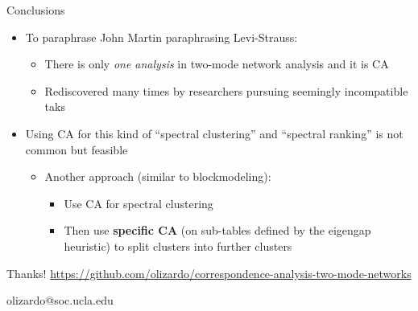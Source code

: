 \documentclass[
  ignorenonframetext,
]{beamer}
\providecommand{\tightlist}{%
  \setlength{\itemsep}{0pt}\setlength{\parskip}{0pt}}\usepackage{longtable,booktabs,array}
\begin{document}
\begin{frame}{Conclusions}
\protect\hypertarget{conclusions-2}{}
\begin{itemize}
\tightlist
\item
  To paraphrase John Martin paraphrasing Levi-Strauss:

  \begin{itemize}
  \tightlist
  \item
    There is only \emph{one analysis} in two-mode network analysis and
    it is CA
  \item
    Rediscovered many times by researchers pursuing seemingly
    incompatible taks
  \end{itemize}
\end{itemize}

\pause

\begin{itemize}
\tightlist
\item
  Using CA for this kind of ``spectral clustering'' and ``spectral
  ranking'' is not common but feasible

  \begin{itemize}
  \tightlist
  \item
    Another approach (similar to blockmodeling):

    \begin{itemize}
    \tightlist
    \item
      Use CA for spectral clustering
    \item
      Then use \textbf{specific CA} (on sub-tables defined by the
      eigengap heuristic) to split clusters into further clusters
    \end{itemize}
  \end{itemize}
\end{itemize}
\end{frame}

\begin{frame}{Thanks!}
\protect\hypertarget{thanks}{}
\url{https://github.com/olizardo/correspondence-analysis-two-mode-networks}

olizardo@soc.ucla.edu
\end{frame}
\end{document}
